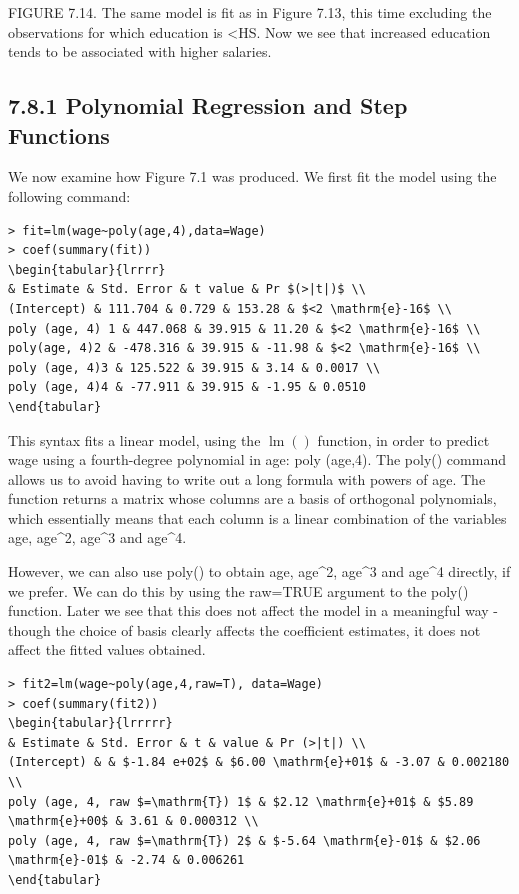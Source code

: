 \documentclass[10pt]{article}
\begin{document}
FIGURE 7.14. The same model is fit as in Figure 7.13, this time excluding the observations for which education is <HS. Now we see that increased education tends to be associated with higher salaries.

\subsection*{7.8.1 Polynomial Regression and Step Functions}
We now examine how Figure 7.1 was produced. We first fit the model using the following command:

\begin{verbatim}
> fit=lm(wage~poly(age,4),data=Wage)
> coef(summary(fit))
\begin{tabular}{lrrrr} 
& Estimate & Std. Error & t value & Pr $(>|t|)$ \\
(Intercept) & 111.704 & 0.729 & 153.28 & $<2 \mathrm{e}-16$ \\
poly (age, 4) 1 & 447.068 & 39.915 & 11.20 & $<2 \mathrm{e}-16$ \\
poly(age, 4)2 & -478.316 & 39.915 & -11.98 & $<2 \mathrm{e}-16$ \\
poly (age, 4)3 & 125.522 & 39.915 & 3.14 & 0.0017 \\
poly (age, 4)4 & -77.911 & 39.915 & -1.95 & 0.0510
\end{tabular}
\end{verbatim}

This syntax fits a linear model, using the $\operatorname{lm}()$ function, in order to predict wage using a fourth-degree polynomial in age: poly (age,4). The poly() command allows us to avoid having to write out a long formula with powers of age. The function returns a matrix whose columns are a basis of orthogonal polynomials, which essentially means that each column is a linear combination of the variables age, age\^{}2, age\^{}3 and age\^{}4.

However, we can also use poly() to obtain age, age\^{}2, age\^{}3 and age\^{}4 directly, if we prefer. We can do this by using the raw=TRUE argument to the poly() function. Later we see that this does not affect the model in a meaningful way - though the choice of basis clearly affects the coefficient estimates, it does not affect the fitted values obtained.

\begin{verbatim}
> fit2=lm(wage~poly(age,4,raw=T), data=Wage)
> coef(summary(fit2))
\begin{tabular}{lrrrrr} 
& Estimate & Std. Error & t & value & Pr (>|t|) \\
(Intercept) & & $-1.84 e+02$ & $6.00 \mathrm{e}+01$ & -3.07 & 0.002180 \\
poly (age, 4, raw $=\mathrm{T}) 1$ & $2.12 \mathrm{e}+01$ & $5.89 \mathrm{e}+00$ & 3.61 & 0.000312 \\
poly (age, 4, raw $=\mathrm{T}) 2$ & $-5.64 \mathrm{e}-01$ & $2.06 \mathrm{e}-01$ & -2.74 & 0.006261
\end{tabular}
\end{verbatim}
\end{document}
